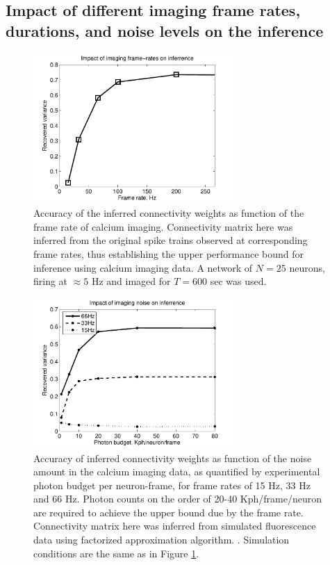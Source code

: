 \subsection{Impact of different imaging frame rates, durations, and noise levels on the inference}

\begin{figure}[h]
\centering
\includegraphics[width=3in]{../figs/FigureA5_recvar}
\caption{Accuracy of the inferred connectivity weights as function of the frame rate of calcium imaging. Connectivity matrix here was inferred from the original spike trains observed at corresponding frame rates, thus establishing the upper performance bound for inference using calcium imaging data. A network of $N=25$ neurons, firing at $\approx 5$ Hz and imaged for $T=600$ sec was used.}
\label{fig:recvar}
\end{figure}

\begin{figure}[h]
\centering
\includegraphics[width=3in]{../figs/FigureA6_recvar_SNR}
\caption{Accuracy of inferred connectivity weights as function of the noise amount in the calcium imaging data, as quantified by experimental photon budget per neuron-frame, for frame rates of 15 Hz, 33 Hz and 66 Hz. Photon counts on the order of 20-40 Kph/frame/neuron are required to achieve the upper bound due by the frame rate. Connectivity matrix here was inferred from simulated fluorescence data using factorized approximation algorithm. . Simulation conditions are the same as in Figure \ref{fig:recvar}.}
\label{fig:recvar-SNR}
\end{figure}

